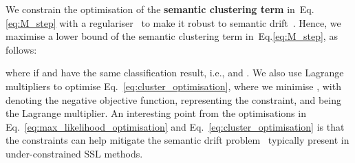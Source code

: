 \documentclass[review]{elsarticle}
\theoremstyle{plain}
\begin{document}
We constrain the optimisation of the \textbf{semantic clustering term} in~Eq.\ref{eq:M_step} with a 
regulariser~\citep{SCAN} to make it robust to semantic drift~\citep{zhang2019addressing}.
Hence, we maximise a lower bound of 
the semantic clustering term in~Eq.\ref{eq:M_step}, as follows:

where  if  and  have the same classification result, i.e.,
 and .
We also use Lagrange multipliers to optimise Eq.~\ref{eq:cluster_optimisation}, where we minimise , with  denoting the negative objective function,  representing the constraint, and  being the Lagrange multiplier. An interesting point from the optimisations in Eq.~\ref{eq:max_likelihood_optimisation}
and Eq.~\ref{eq:cluster_optimisation} is that the constraints can help mitigate the semantic drift problem~\citep{zhang2019addressing} typically present in under-constrained SSL methods. 
\end{document}
